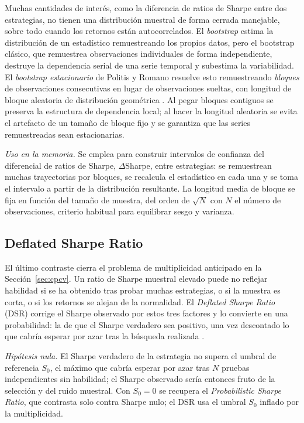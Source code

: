 Muchas cantidades de interés, como la diferencia de ratios de Sharpe entre dos estrategias, no tienen una distribución muestral de forma cerrada manejable, sobre todo cuando los retornos están autocorrelados. El \emph{bootstrap} estima la distribución de un estadístico remuestreando los propios datos, pero el bootstrap clásico, que remuestrea observaciones individuales de forma independiente, destruye la dependencia serial de una serie temporal y subestima la variabilidad. El \emph{bootstrap estacionario} de Politis y Romano resuelve esto remuestreando \emph{bloques} de observaciones consecutivas en lugar de observaciones sueltas, con longitud de bloque aleatoria de distribución geométrica \cite{politis1994}. Al pegar bloques contiguos se preserva la estructura de dependencia local; al hacer la longitud aleatoria se evita el artefacto de un tamaño de bloque fijo y se garantiza que las series remuestreadas sean estacionarias.

\emph{Uso en la memoria.} Se emplea para construir intervalos de confianza del diferencial de ratios de Sharpe, $\Delta$Sharpe, entre estrategias: se remuestrean muchas trayectorias por bloques, se recalcula el estadístico en cada una y se toma el intervalo a partir de la distribución resultante. La longitud media de bloque se fija en función del tamaño de muestra, del orden de $\sqrt{N}$ con $N$ el número de observaciones, criterio habitual para equilibrar sesgo y varianza.

\subsection{Deflated Sharpe Ratio}
\label{sec:tests-dsr}

El último contraste cierra el problema de multiplicidad anticipado en la Sección~\ref{sec:cpcv}. Un ratio de Sharpe muestral elevado puede no reflejar habilidad si se ha obtenido tras probar muchas estrategias, o si la muestra es corta, o si los retornos se alejan de la normalidad. El \emph{Deflated Sharpe Ratio} (DSR) corrige el Sharpe observado por estos tres factores y lo convierte en una probabilidad: la de que el Sharpe verdadero sea positivo, una vez descontado lo que cabría esperar por azar tras la búsqueda realizada \cite{bailey2014}.

\emph{Hipótesis nula.} El Sharpe verdadero de la estrategia no supera el umbral de referencia $S_0$, el máximo que cabría esperar por azar tras $N$ pruebas independientes sin habilidad; el Sharpe observado sería entonces fruto de la selección y del ruido muestral. Con $S_0 = 0$ se recupera el \emph{Probabilistic Sharpe Ratio}, que contrasta solo contra Sharpe nulo; el DSR usa el umbral $S_0$ inflado por la multiplicidad.

